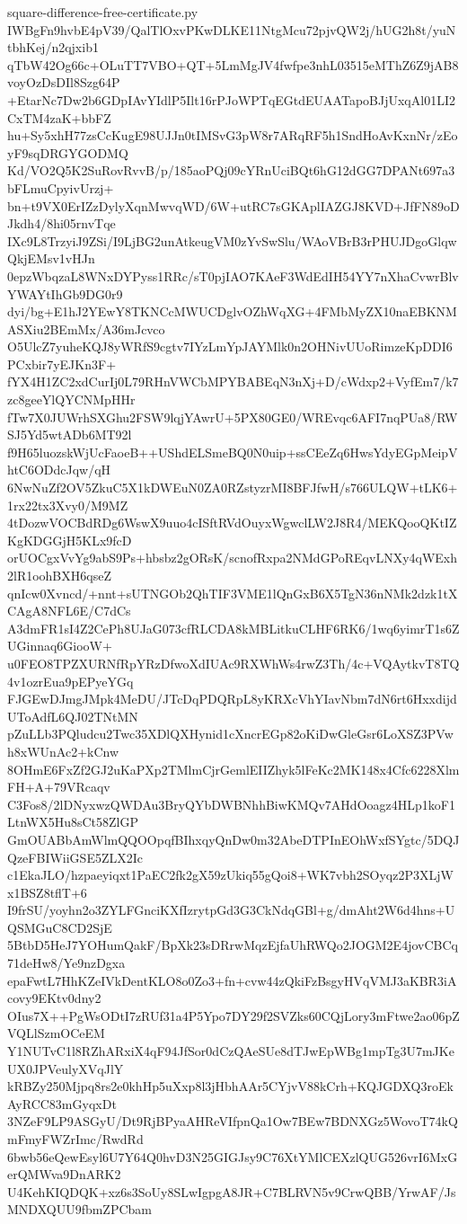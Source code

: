 \documentclass[11pt]{article}
\theoremstyle{definition}
\theoremstyle{remark}
\begin{document}
\begin{filecontents*}[overwrite]{square-difference-free-certificate.py}
IWBgFn9hvbE4pV39/QalTlOxvPKwDLKE11NtgMcu72pjvQW2j/hUG2h8t/yuNtbhKej/n2qjxib1
qTbW42Og66c+OLuTT7VBO+QT+5LmMgJV4fwfpe3nhL03515eMThZ6Z9jAB8voyOzDsDIl8Szg64P
+EtarNc7Dw2b6GDpIAvYIdlP5Ilt16rPJoWPTqEGtdEUAATapoBJjUxqAl01LI2CxTM4zaK+bbFZ
hu+Sy5xhH77zsCcKugE98UJJn0tIMSvG3pW8r7ARqRF5h1SndHoAvKxnNr/zEoyF9sqDRGYGODMQ
Kd/VO2Q5K2SuRovRvvB/p/185aoPQj09cYRnUciBQt6hG12dGG7DPANt697a3bFLmuCpyivUrzj+
bn+t9VX0ErIZzDylyXqnMwvqWD/6W+utRC7sGKAplIAZGJ8KVD+JfFN89oDJkdh4/8hi05rnvTqe
IXc9L8TrzyiJ9ZSi/I9LjBG2unAtkeugVM0zYvSwSlu/WAoVBrB3rPHUJDgoGlqwQkjEMsv1vHJn
0epzWbqzaL8WNxDYPyss1RRc/sT0pjIAO7KAeF3WdEdIH54YY7nXhaCvwrBlvYWAYtIhGb9DG0r9
dyi/bg+E1hJ2YEwY8TKNCcMWUCDglvOZhWqXG+4FMbMyZX10naEBKNMASXiu2BEmMx/A36mJcvco
O5UlcZ7yuheKQJ8yWRfS9cgtv7IYzLmYpJAYMlk0n2OHNivUUoRimzeKpDDI6PCxbir7yEJKn3F+
fYX4H1ZC2xdCurIj0L79RHnVWCbMPYBABEqN3nXj+D/cWdxp2+VyfEm7/k7zc8geeYlQYCNMpHHr
fTw7X0JUWrhSXGhu2FSW9lqjYAwrU+5PX80GE0/WREvqc6AFI7nqPUa8/RWSJ5Yd5wtADb6MT92l
f9H65luozskWjUcFaoeB++UShdELSmeBQ0N0uip+ssCEeZq6HwsYdyEGpMeipVhtC6ODdcJqw/qH
6NwNuZf2OV5ZkuC5X1kDWEuN0ZA0RZstyzrMI8BFJfwH/s766ULQW+tLK6+1rx22tx3Xvy0/M9MZ
4tDozwVOCBdRDg6WswX9uuo4cISftRVdOuyxWgwclLW2J8R4/MEKQooQKtIZKgKDGGjH5KLx9fcD
orUOCgxVvYg9abS9Ps+hbsbz2gORsK/scnofRxpa2NMdGPoREqvLNXy4qWExh2lR1oohBXH6qseZ
qnIcw0Xvncd/+nnt+sUTNGOb2QhTIF3VME1lQnGxB6X5TgN36nNMk2dzk1tXCAgA8NFL6E/C7dCs
A3dmFR1sI4Z2CePh8UJaG073cfRLCDA8kMBLitkuCLHF6RK6/1wq6yimrT1s6ZUGinnaq6GiooW+
u0FEO8TPZXURNfRpYRzDfwoXdIUAc9RXWhWs4rwZ3Th/4c+VQAytkvT8TQ4v1ozrEua9pEPyeYGq
FJGEwDJmgJMpk4MeDU/JTcDqPDQRpL8yKRXcVhYIavNbm7dN6rt6HxxdijdUToAdfL6QJ02TNtMN
pZuLLb3PQludcu2Twc35XDlQXHynid1cXncrEGp82oKiDwGleGsr6LoXSZ3PVwh8xWUnAc2+kCnw
8OHmE6FxZf2GJ2uKaPXp2TMlmCjrGemlEIIZhyk5lFeKc2MK148x4Cfc6228XlmFH+A+79VRcaqv
C3Fos8/2lDNyxwzQWDAu3BryQYbDWBNhhBiwKMQv7AHdOoagz4HLp1koF1LtnWX5Hu8sCt58ZlGP
GmOUABbAmWlmQQOOpqfBIhxqyQnDw0m32AbeDTPInEOhWxfSYgtc/5DQJQzeFBIWiiGSE5ZLX2Ic
c1EkaJLO/hzpaeyiqxt1PaEC2fk2gX59zUkiq55gQoi8+WK7vbh2SOyqz2P3XLjWx1BSZ8tflT+6
I9frSU/yoyhn2o3ZYLFGnciKXfIzrytpGd3G3CkNdqGBl+g/dmAht2W6d4hns+UQSMGuC8CD2SjE
5BtbD5HeJ7YOHumQakF/BpXk23sDRrwMqzEjfaUhRWQo2JOGM2E4jovCBCq71deHw8/Ye9nzDgxa
epaFwtL7HhKZeIVkDentKLO8o0Zo3+fn+cvw44zQkiFzBsgyHVqVMJ3aKBR3iAcovy9EKtv0dny2
OIus7X++PgWsODtI7zRUf31a4P5Ypo7DY29f2SVZks60CQjLory3mFtwe2ao06pZVQLlSzmOCeEM
Y1NUTvC1l8RZhARxiX4qF94JfSor0dCzQAeSUe8dTJwEpWBg1mpTg3U7mJKeUX0JPVeulyXVqJlY
kRBZy250Mjpq8rs2e0khHp5uXxp8l3jHbhAAr5CYjvV88kCrh+KQJGDXQ3roEkAyRCC83mGyqxDt
3NZeF9LP9ASGyU/Dt9RjBPyaAHReVIfpnQa1Ow7BEw7BDNXGz5WovoT74kQmFmyFWZrImc/RwdRd
6bwb56eQewEsyl6U7Y64Q0hvD3N25GIGJsy9C76XtYMlCEXzlQUG526vrI6MxGerQMWva9DnARK2
U4KehKIQDQK+xz6s3SoUy8SLwIgpgA8JR+C7BLRVN5v9CrwQBB/YrwAF/JsMNDXQUU9fbmZPCbam

\end{filecontents*}
\end{document}
